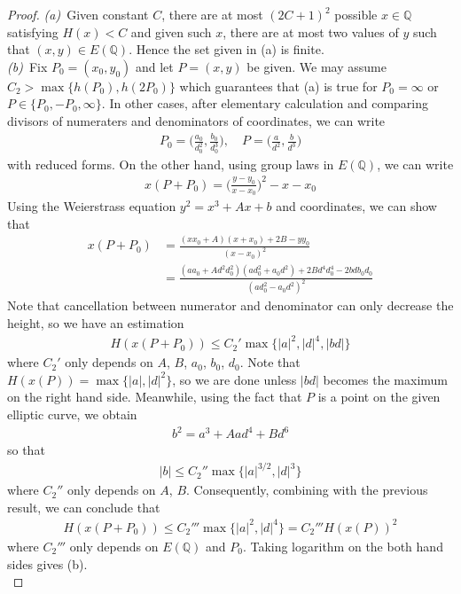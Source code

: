\documentclass[11pt]{article}
\newcommand{\<}{\langle}
\renewcommand{\>}{\rangle}
\numberwithin{equation}{section}
\theoremstyle{plain}
\theoremstyle{definition}
\begin{document}
\begin{proof}
    \textit{(a)}\ Given constant \(C\), there are at most \((2C+1)^2\) possible \( x\in \mathbb{Q}\) satisfying \( H(x) < C \) and given such \(x\), there are at most two values of \(y\) such that \( (x,y) \in E(\mathbb{Q})\). Hence the set given in (a) is finite.
    \\
    
    \textit{(b)}\ Fix \(P_0 = (x_0, y_0)\) and let \(P = (x,y)\) be given. We may assume \(C_2 > \max{\{h(P_0), h(2P_0)\}}\) which guarantees that (a) is true for \( P_0 = \infty\) or \(P \in \{P_0, -P_0, \infty\} \). In other cases, after elementary calculation and comparing divisors of numeraters and denominators of coordinates, we can write 
        \begin{align*}
            P_0 = \bigg( \frac{a_0}{d_0^2} , \frac{b_0}{d_0^3} \bigg), \quad P = \bigg( \frac{a}{d^2} , \frac{b}{d^3} \bigg)
        \end{align*}
    with reduced forms. On the other hand, using group laws in \(E(\mathbb{Q})\), we can write
        \begin{align*}
            x(P+P_0) = \bigg( \frac{y-y_0}{x-x_0} \bigg)^2 - x - x_0
        \end{align*}
    Using the Weierstrass equation \( y^2 = x^3 + Ax + b \) and coordinates, we can show that
        \begin{align*}
            x(P+P_0) &= \frac{ (xx_0+A)(x+x_0) + 2B - yy_0}{(x-x_0)^2}
                     \\
                     &= \frac{ (aa_0 + Ad^2d_0^2)(ad_0^2+a_0d^2) + 2Bd^4d_0^4-2bdb_0d_0}{(ad_0^2-a_0d^2)^2}
        \end{align*}
    Note that cancellation between numerator and denominator can only decrease the height, so we have an estimation
        \begin{align*}
            H(x(P+P_0)) \le C_2' \max \{ \lvert a \rvert ^2, \lvert d \rvert ^4, \lvert bd \rvert \} 
        \end{align*}
    where \(C_2'\) only depends on \( A\), \(B\), \(a_0\), \(b_0\), \(d_0\). Note that \(H(x(P)) = \max \{ \lvert a \rvert, \lvert d \rvert ^2 \} \), so we are done unless \( \lvert bd \rvert \) becomes the maximum on the right hand side. Meanwhile, using the fact that \(P\) is a point on the given elliptic curve, we obtain
        \begin{align*}
            b^2 = a^3 + Aad^4 + Bd^6
        \end{align*}
    so that
        \begin{align*}
            \lvert b \rvert \le C_2'' \max \{ \lvert a \rvert ^{3/2}, \lvert d \rvert^3\}
        \end{align*}
    where \(C_2''\) only depends on \(A\), \(B\). Consequently, combining with the previous result, we can conclude that
        \begin{align*}
            H(x(P+P_0)) \le C_2''' \max \{ \lvert a \rvert ^2, \lvert d \rvert ^4 \} = C_2'''H(x(P))^2
        \end{align*}
    where \(C_2'''\) only depends on \(E(\mathbb{Q})\) and \(P_0\). Taking logarithm on the both hand sides gives (b).
    \\
    

\end{proof}
\end{document}
